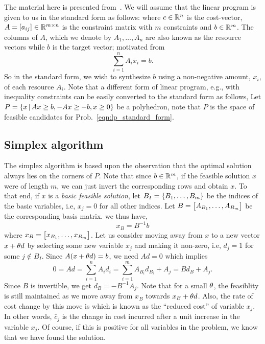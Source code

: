 \documentclass[letterpaper, 10pt, twocolumn, reqno]{amsart}
\begin{document}
The material here is presented from~\cite{bertsimas1997introduction}. We will assume that the linear program is given to us in the standard form as follows:
where $c \in \mathbb{R}^n$ is the cost-vector, $A = [a_{ij}] \in \mathbb{R}^{m \times n}$ is the constraint matrix with $m$ constraints and $b \in \mathbb{R}^m$. The columns of $A$, which we denote by $A_1, \ldots, A_n$ are also known as the resource vectors while $b$ is the target vector; motivated from
$$\sum_{i=1}^n A_i x_i =b.$$
So in the standard form, we wish to synthesize $b$ using a non-negative amount, $x_i$, of each resource $A_i$. Note that a different form of linear program, e.g., with inequality constraints can be easily converted to the standard form as follows,
Let $P = \left\{x \, \vert \, Ax \geq b, -Ax \geq -b, x \geq 0\right\}$ be a polyhedron, note that $P$ is the space of feasible candidates for Prob.~\eqref{eqn:lp_standard_form}.

\subsection{Simplex algorithm}
\label{ssec:simplex}
The simplex algorithm is based upon the observation that the optimal solution always lies on the corners of $P$. Note that since $b \in \mathbb{R}^m$, if the feasible solution $x$ were of length $m$, we can just invert the corresponding rows and obtain $x$. To that end, if $x$ is a \emph{basic feasible solution}, let $B_I = \left\{B_1, \ldots, B_m\right\}$ be the indices of the basic variables, i.e, $x_j = 0$ for all other indices. Let $B = \begin{bmatrix}A_{B_1}, \ldots, A_{B_m}\end{bmatrix}$ be the corresponding basis matrix. we thus have,
$$
x_B = B^{-1} b
$$
where $x_B = \begin{bmatrix}x_{B_1}, \ldots, x_{B_m}\end{bmatrix}$.
Let us consider moving away from $x$ to a new vector $x + \theta d$ by selecting some new variable $x_j$ and making it non-zero, i.e, $d_j = 1$ for some $j \notin B_I$. Since $A(x+\theta d) = b$, we need $A d = 0$ which implies
$$
0 = A d = \sum_{i=1}^n A_i d_i = \sum_{i=1}^m A_{B_i} d_{B_i} + A_j = B d_B + A_j.
$$
Since $B$ is invertible, we get $d_B = -B^{-1} A_j$. Note that for a small $\theta$, the feasiblity is still maintained as we move away from $x_B$ towards $x_B + \theta d$. Also, the rate of cost change by this move is
which is known as the ``reduced cost'' of variable $x_j$. In other words, $\bar{c}_j$ is the change in cost incurred after a unit increase in the variable $x_j$. Of course, if this is positive for all variables in the problem, we know that we have found the solution.
\end{document}
